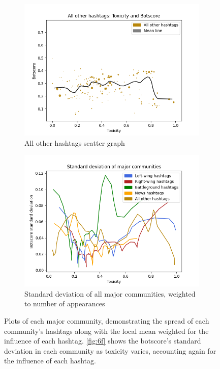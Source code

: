 \documentclass[a4paper,11pt]{article}  %
\begin{document}
\begin{figure}
		\begin{subfigure}[b]{0.475\textwidth}   
			\centering 
			\includegraphics[width=\textwidth]{images/plt_other}
			\caption{All other hashtags scatter graph}
			\label{fig:6e}
		\end{subfigure}
		\hfill
		\begin{subfigure}[b]{0.475\textwidth}   
			\centering 
			\includegraphics[width=\textwidth]{images/plt_major_dev}
			\caption{Standard deviation of all major communities, weighted to number of appearances}
			\label{fig:6f}
		\end{subfigure}
		
		\caption{Plots of each major community, demonstrating the spread of each community's hashtags along with the local mean weighted for the influence of each hashtag. \autoref{fig:6f} shows the botscore's standard deviation in each community as toxicity varies, accounting again for the influence of each hashtag.}
		\label{fig:6}
	\end{figure}
\end{document}
